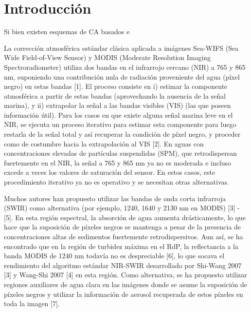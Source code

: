 


\section{Introducción}
\label{pca:s:introduccion}

Si bien existen esquemas de CA basados e

La corrección atmosférica estándar clásica aplicada a imágenes Sea-WIFS (Sea Wide Field-of-View Sensor) y MODIS (Moderate Resolution Imaging Spectroradiometer) utiliza dos bandas en el infrarrojo cercano (NIR) a 765 y 865 nm, suponiendo una contribución nula de radiación proveniente del agua (píxel negro) en estas bandas [1]. El proceso consiste en i) estimar la componente atmosférica a partir de estas bandas (aprovechando la ausencia de la señal marina), y ii) extrapolar la señal a las bandas visibles (VIS) (las que poseen información útil). Para los casos en que existe alguna señal marina leve en el NIR, se ejecuta un proceso iterativo para estimar esta componente para luego restarla de la señal total y así recuperar la condición de píxel negro, y proceder como de costumbre hacia la extrapolación al VIS [2]. En aguas con concentraciones elevadas de partículas suspendidas (SPM), que retrodispersan fuertemente en el NIR, la señal a 765 y 865 nm ya no es moderada e incluso excede a veces los valores de saturación del sensor. En estos casos, este procedimiento iterativo ya no es operativo y se necesitan otras alternativas.

Muchos autores han propuesto utilizar las bandas de onda corta infrarroja (SWIR) como alternativa (por ejemplo, 1240, 1640 y 2130 nm en MODIS) [3] - [5]. En esta región espectral, la absorción de agua aumenta drásticamente, lo que hace que la suposición de píxeles negros se mantenga a pesar de la presencia de concentraciones altas de sedimentos fuertemente retrodispersivos. Aun así, se ha encontrado que en la región de turbidez máxima en el RdP, la reflectancia a la banda MODIS de 1240 nm todavía no es despreciable [6], lo que socava el rendimiento del algoritmo estándar NIR-SWIR desarrollado por Shi-Wang 2007 [3] y Wang-Shi 2007 [4] en esta región. Como alternativa, se ha propuesto utilizar regiones auxiliares de agua clara en las imágenes donde se asume la suposición de píxeles negros y utilizar la información de aerosol recuperada de estos píxeles en toda la imagen [7].


